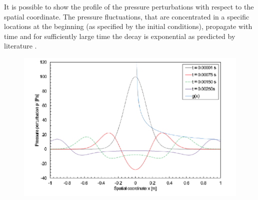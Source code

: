 It is possible to show the profile of the pressure perturbations with respect to
the spatial coordinate. The pressure fluctuations, that are concentrated  in a
specific locations at the beginning (as specified by the initial conditions),
propagate with time and for sufficiently large time the decay is exponential as
predicted by literature \cite{DoFf83}.

\begin{figure}
	\centering
	\includegraphics[width=0.7\linewidth]{img/prog_4.png}
	\caption{}
\end{figure}

